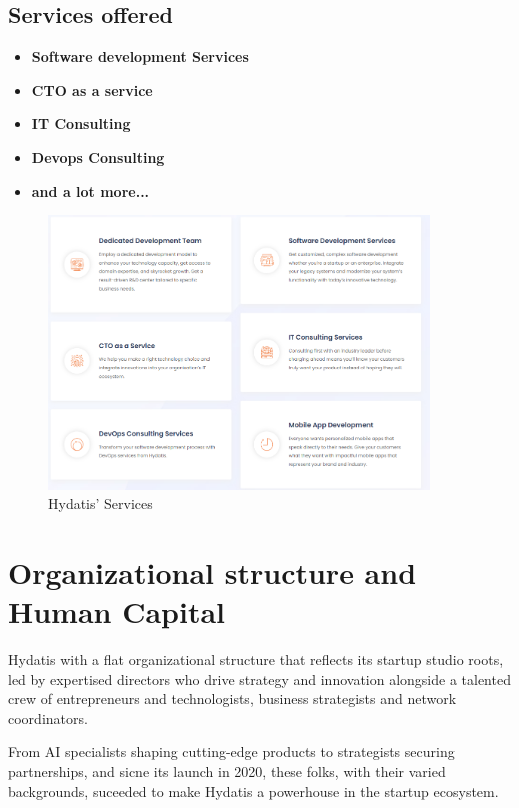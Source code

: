 \documentclass[12pt,a4paper,oneside,english]{book}
\begin{document}
\subsection{Services offered}
\begin{itemize}
    \item \textbf {Software development Services}
    \item \textbf{CTO as a service}
    \item \textbf{IT Consulting}
    \item \textbf{Devops Consulting}
    \item \textbf{and a lot more...}
\end{itemize}
\begin{figure}[h!]
    \centering
    \includegraphics[width=0.9\textwidth]{images/services_hydatis.png}
    \caption{Hydatis' Services}
    \label{fig:Services_hydatis}
\end{figure}

\section{Organizational structure and Human Capital} %
Hydatis with a flat organizational structure that reflects its startup studio roots, led by  expertised directors who drive strategy and innovation alongside a talented crew of entrepreneurs and technologists, business strategists and network coordinators.

From AI specialists shaping cutting-edge products to strategists securing partnerships, and sicne its launch in 2020, these folks, with their varied backgrounds, suceeded to make Hydatis a powerhouse in the startup ecosystem.
\end{document}
